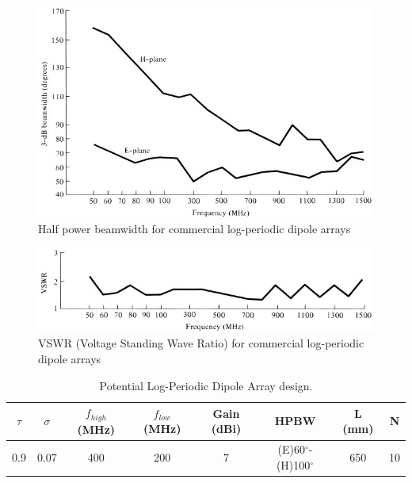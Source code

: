 \begin{figure}[htb]
\centering
    \captionsetup{width=0.8\textwidth}
        \centering
        \includegraphics[width=1\textwidth]{figures/Yannis/HPBW_Log.jpg}
        \caption{Half power beamwidth for commercial log-periodic dipole arrays\cite{balanis}}
        \label{hpbw_log}
\end{figure}
\begin{figure}[htb]
\centering
        \captionsetup{width=0.8\textwidth}
        \centering
        \includegraphics[width=1\linewidth]{figures/Yannis/VSWR_log.jpg}
        \caption{VSWR (Voltage Standing Wave Ratio) for commercial log-periodic dipole arrays\cite{balanis}}
        \label{vswr_lpda}
\end{figure}

\begin{table}[htb]
\begin{tabular}{| c | c | c | c | c | c | c | c |}
\hline
 $\tau$ & $\sigma$ & $f_{high}$ (MHz) & $f_{low}$ (MHz) & Gain (dBi) & HPBW & L (mm) & N \\ 
 \hline
 0.9 & 0.07 & 400 & 200 & 7 & (E)60$^\circ$-(H)100$^\circ$ & 650 & 10 \\
 \hline
\end{tabular}
\caption{Potential Log-Periodic Dipole Array design.}
\label{table: LPDA}
\end{table}

